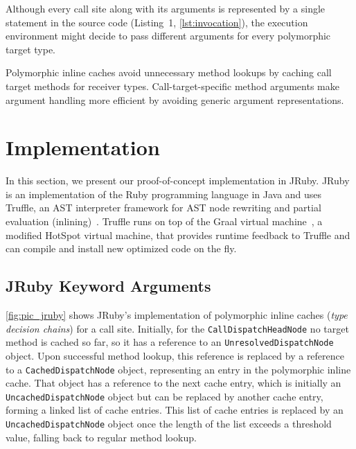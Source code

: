 \documentclass{sigplanconf} %
\begin{document}
Although every call site along with its arguments is represented by a single statement in the source code (\eg Listing~1, \autoref{lst:invocation}), the execution environment might decide to pass different arguments for every polymorphic target type.

Polymorphic inline caches avoid unnecessary method lookups by caching call target methods for receiver types. Call-target-specific method arguments make argument handling more efficient by avoiding generic argument representations.

\section{Implementation}
In this section, we present our proof-of-concept implementation in JRuby. JRuby is an implementation of the Ruby programming language in Java and uses Truffle, an AST interpreter framework for AST node rewriting and partial evaluation (inlining)~\cite{Wurthinger:2013:OVR:2509578.2509581, Wurthinger:2012:SAI:2384577.2384587}. Truffle runs on top of the Graal virtual machine~\cite{Wimmer:2012:TSR:2384716.2384723}, a modified HotSpot virtual machine, that provides runtime feedback to Truffle and can compile and install new optimized code on the fly.

\subsection{JRuby Keyword Arguments}
\autoref{fig:pic_jruby} shows JRuby's implementation of polymorphic inline
caches (\emph{type decision chains}) for a call site. Initially, for the
\lstinline{CallDispatchHeadNode} no target method is cached so far, so it has a reference to an \lstinline{UnresolvedDispatchNode} object. Upon successful method lookup, this reference is replaced by a reference to a \lstinline{CachedDispatchNode} object, representing an entry in the polymorphic inline cache. That object has a reference to the next cache entry, which is initially an \lstinline{UncachedDispatchNode} object but can be replaced by another cache entry, forming a linked list of cache entries. This list of cache entries is replaced by an \lstinline{UncachedDispatchNode} object once the length of the list exceeds a threshold value, falling back to regular method lookup.
\end{document}
